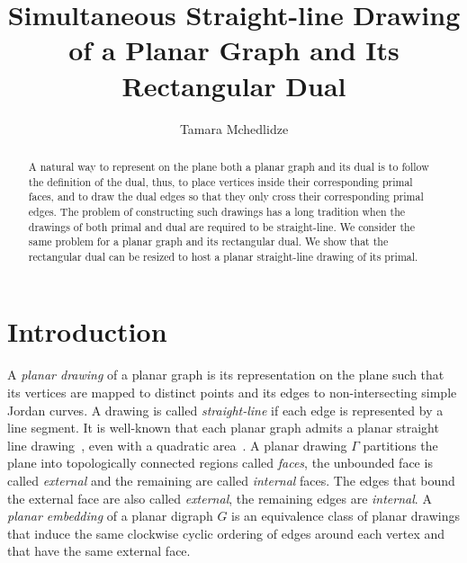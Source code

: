 \documentclass{llncs}
\title{Simultaneous Straight-line Drawing of a Planar Graph and Its Rectangular Dual }
\author{
Tamara  Mchedlidze}
\institute{Faculty of Informatics, Karlsruhe
Institute of Technology (KIT), Germany \texttt{mched@iti.uka.de}}
\begin{document}
\maketitle

\begin{abstract}
A natural way to represent on the plane both a planar graph and its dual is to follow the definition of the dual, thus, to place vertices inside their corresponding primal faces, and to draw the dual edges so that they only cross their corresponding primal edges. The problem of constructing such drawings has a long tradition when the drawings of both primal and dual are required to be straight-line. We consider the same problem for a planar graph and its rectangular dual.  We show that the rectangular dual can be resized to host a planar straight-line drawing of its primal.  
\end{abstract}

\section{Introduction}


A \emph{planar drawing} of a planar graph is its representation  on the plane such that its vertices  are mapped to distinct points and its edges to non-intersecting simple Jordan curves. A drawing is called \emph{straight-line} if each edge is represented by a line segment.  It is well-known that each planar graph admits a planar straight line drawing~\cite{Fary48},  even with a quadratic area~\cite{DFPP90,Schnyd90}.
A planar drawing $\Gamma$ partitions the plane into topologically connected regions called \emph{faces}, the unbounded face is called \emph{external} and the remaining are called \emph{internal} faces. The edges  that bound the external face are also called \emph{external}, the remaining edges are \emph{internal}.  A \emph{planar embedding} of a planar digraph $G$ is an equivalence class of planar drawings that induce the same clockwise cyclic ordering of edges around each vertex and that have the same external face. 
 
\end{document}
